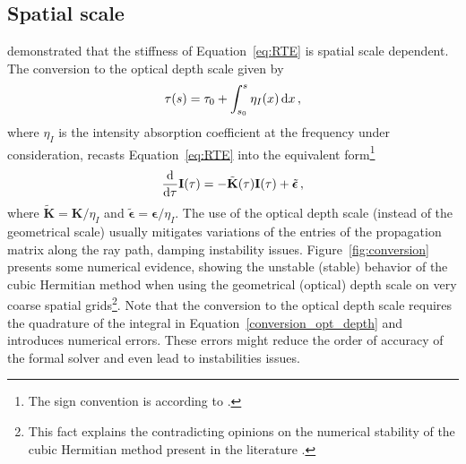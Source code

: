 \documentclass[iop,numberedappendix,twocolappendix,twocolumn]{emulateapj}
\begin{document}
\subsection{Spatial scale}\label{subsec:4.5}
%
\citet{janett2018a} demonstrated that the stiffness of Equation~\eqref{eq:RTE} is spatial scale dependent.
The conversion to the optical depth scale given by
%
\begin{equation}
\tau(s) = \tau_0 + \int_{s_0}^s \eta_I(x)\,{\rm d}x\,,
\label{conversion_opt_depth}
\end{equation}
%
where $\eta_I$ is the intensity absorption coefficient at the frequency under consideration,
recasts Equation~\eqref{eq:RTE} into the equivalent form\footnote{The sign convention is according to \citet{janett2018a}.}
%
\begin{equation*}
\frac{\rm d}{\rm d\tau}\mathbf I(\tau) = -\tilde{\mathbf K}(\tau)\mathbf I(\tau) + \tilde{\boldsymbol{\epsilon}}\,,
\end{equation*}
%
where $\tilde{\mathbf K}=\mathbf K/\eta_I$ and $\tilde{\boldsymbol{\epsilon}}=\boldsymbol{\epsilon}/\eta_I$.
The use of the optical depth scale %
(instead of the geometrical scale)
usually mitigates variations of the entries of the propagation matrix along the ray path, damping instability issues.
Figure~\ref{fig:conversion} presents some numerical evidence,
showing the unstable (stable) behavior of the cubic Hermitian method when using the geometrical (optical) depth scale on very coarse spatial grids\footnote{
This fact explains the contradicting opinions on the numerical stability of the cubic Hermitian method present in the literature
\citep[e.g.,][]{bellot_rubio+al1998,piskunov2002,delacruz_rodriguez+piskunov2013}.}.
Note that the conversion to the optical depth scale requires the quadrature of the integral in Equation~\eqref{conversion_opt_depth}
and introduces numerical errors. These errors might reduce the order of accuracy of the formal solver
and even lead to instabilities issues. 
% 
\end{document}
